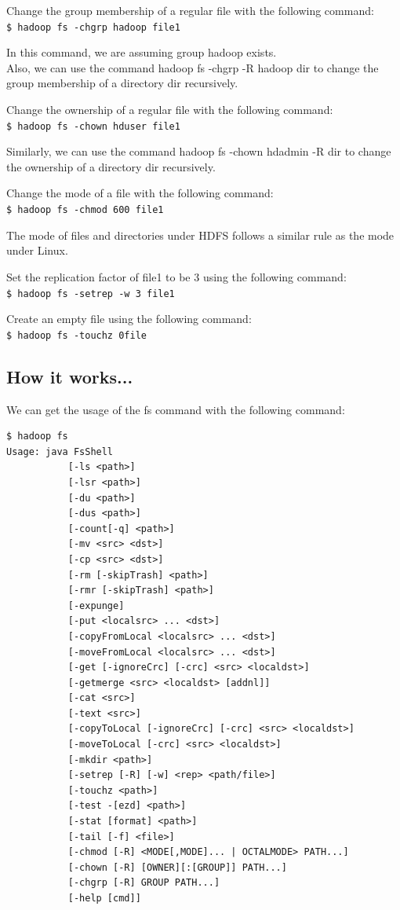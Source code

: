 Change the group membership of a regular file with the following command: \\
\verb|$ hadoop fs -chgrp hadoop file1|

In this command, we are assuming group hadoop exists. \\
Also, we can use the command hadoop fs -chgrp -R hadoop dir to change the group membership of a directory dir recursively.

Change the ownership of a regular file with the following command: \\
\verb|$ hadoop fs -chown hduser file1|

Similarly, we can use the command hadoop fs -chown hdadmin -R dir to change the ownership of a directory dir recursively.

Change the mode of a file with the following command: \\
\verb|$ hadoop fs -chmod 600 file1|

The mode of files and directories under HDFS follows a similar rule as the mode under Linux.

Set the replication factor of file1 to be 3 using the following command:\\
\verb|$ hadoop fs -setrep -w 3 file1|

Create an empty file using the following command: \\
\verb|$ hadoop fs -touchz 0file|

\subsection*{How it works...}
We can get the usage of the fs command with the following command:
\begin{verbatim}
$ hadoop fs
Usage: java FsShell
           [-ls <path>]
           [-lsr <path>]
           [-du <path>]
           [-dus <path>]
           [-count[-q] <path>]
           [-mv <src> <dst>]
           [-cp <src> <dst>]
           [-rm [-skipTrash] <path>]
           [-rmr [-skipTrash] <path>]
           [-expunge]
           [-put <localsrc> ... <dst>]
           [-copyFromLocal <localsrc> ... <dst>]
           [-moveFromLocal <localsrc> ... <dst>]
           [-get [-ignoreCrc] [-crc] <src> <localdst>]
           [-getmerge <src> <localdst> [addnl]]
           [-cat <src>]
           [-text <src>]
           [-copyToLocal [-ignoreCrc] [-crc] <src> <localdst>]
           [-moveToLocal [-crc] <src> <localdst>]
           [-mkdir <path>]
           [-setrep [-R] [-w] <rep> <path/file>]
           [-touchz <path>]
           [-test -[ezd] <path>]
           [-stat [format] <path>]
           [-tail [-f] <file>]
           [-chmod [-R] <MODE[,MODE]... | OCTALMODE> PATH...]
           [-chown [-R] [OWNER][:[GROUP]] PATH...]
           [-chgrp [-R] GROUP PATH...]
           [-help [cmd]]
\end{verbatim}

